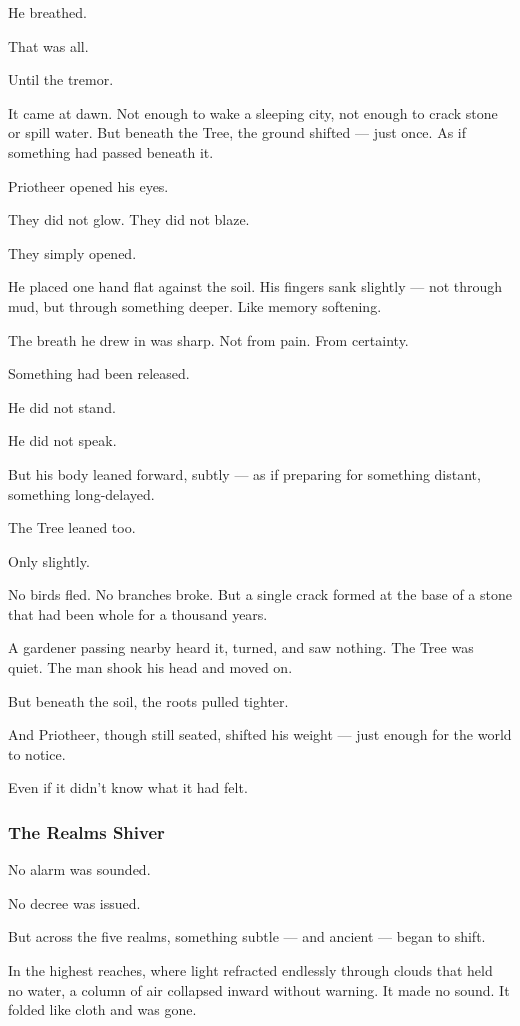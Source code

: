 \documentclass[12pt]{article}
\begin{document}
He breathed.

That was all.

Until the tremor.

It came at dawn. Not enough to wake a sleeping city, not enough to crack stone or spill water. But beneath the Tree, the ground shifted — just once. As if something had passed beneath it.

Priotheer opened his eyes.

They did not glow. They did not blaze.

They simply opened.

He placed one hand flat against the soil. His fingers sank slightly — not through mud, but through something deeper. Like memory softening.

The breath he drew in was sharp. Not from pain. From certainty.

Something had been released.

He did not stand.

He did not speak.

But his body leaned forward, subtly — as if preparing for something distant, something long-delayed.

The Tree leaned too.

Only slightly.

No birds fled. No branches broke. But a single crack formed at the base of a stone that had been whole for a thousand years.

A gardener passing nearby heard it, turned, and saw nothing. The Tree was quiet. The man shook his head and moved on.

But beneath the soil, the roots pulled tighter.

And Priotheer, though still seated, shifted his weight — just enough for the world to notice.

Even if it didn’t know what it had felt.

\dotfill

\subsubsection{The Realms Shiver}

No alarm was sounded.

No decree was issued.

But across the five realms, something subtle — and ancient — began to shift.

In the highest reaches, where light refracted endlessly through clouds that held no water, a column of air collapsed inward without warning. It made no sound. It folded like cloth and was gone.
\end{document}
